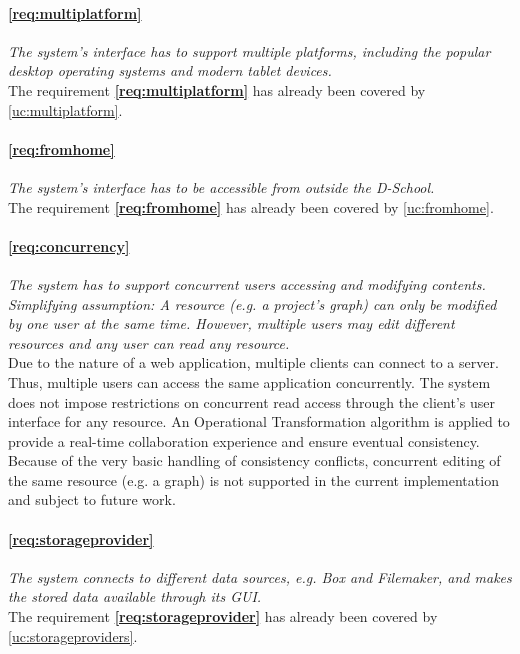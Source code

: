 \paragraph{\ref{req:multiplatform}} \textit{The system's interface has to support multiple platforms, including the popular desktop operating systems and modern tablet devices.}\\
The requirement \textbf{\ref{req:multiplatform}} has already been covered by \ref{uc:multiplatform}.

\paragraph{\ref{req:fromhome}} \textit{The system's interface has to be accessible from outside the D-School.}\\
The requirement \textbf{\ref{req:fromhome}} has already been covered by \ref{uc:fromhome}.

\paragraph{\ref{req:concurrency}} \textit{The system has to support concurrent users accessing and modifying contents. \textit{Simplifying assumption}: A resource (e.g. a project's graph) can only be modified by one user at the same time. However, multiple users may edit different resources and any user can read any resource.}\\
Due to the nature of a web application, multiple clients can connect to a server. Thus, multiple users can access the same application concurrently. The system does not impose restrictions on concurrent read access through the client's user interface for any resource. An Operational Transformation algorithm is applied to provide a real-time collaboration experience and ensure eventual consistency. Because of the very basic handling of consistency conflicts, concurrent editing of the same resource (e.g. a graph) is not supported in the current implementation and subject to future work.

\paragraph{\ref{req:storageprovider}} \textit{The system connects to different data sources, e.g. Box and Filemaker, and makes the stored data available through its GUI.}\\
The requirement \textbf{\ref{req:storageprovider}} has already been covered by \ref{uc:storageproviders}.
